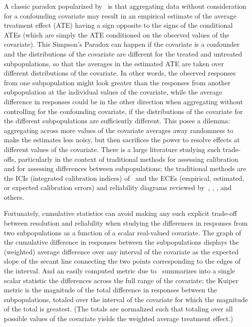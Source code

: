 \documentclass[]{fairmeta}
\begin{document}
A classic paradox popularized by~\cite{simpson} is that aggregating data
without consideration for a confounding covariate may result
in an empirical estimate of the average treatment effect (ATE)
having a sign opposite to the signs of the conditional ATEs
(which are simply the ATE conditioned on the observed values of the covariate).
This Simpson's Paradox can happen if the covariate is a confounder
and the distributions of the covariate are different
for the treated and untreated subpopulations, so that the averages
in the estimated ATE are taken over different distributions of the covariate.
In other words, the observed responses from one subpopulation
might look greater than the responses from another subpopulation
at the individual values of the covariate, while the average difference
in responses could be in the other direction when aggregating
without controlling for the confounding covariate, if the distributions
of the covariate for the different subpopulations are sufficiently different.
This poses a dilemma: aggregating across more values of the covariate
averages away randomness to make the estimates less noisy,
but then sacrifices the power to resolve effects at different values
of the covariate. There is a large literature studying such trade-offs,
particularly in the context of traditional methods for assessing calibration
and for assessing differences between subpopulations; the traditional methods
are the ICIs (integrated calibration indices) of~\cite{austin-steyerberg}
and the ECEs (empirical, estimated, or expected calibration errors)
and reliability diagrams reviewed by~\cite{brocker-smith}, \cite{brocker},
\cite{wilks}, and others.

Fortunately, cumulative statistics can avoid making any such explicit trade-off
between resolution and reliability when studying the differences in responses
from two subpopulations as a function of a scalar real-valued covariate.
The graph of the cumulative difference in responses between the subpopulations
displays the (weighted) average difference over any interval of the covariate
as the expected slope of the secant line connecting the two points
corresponding to the edges of the interval.
And an easily computed metric due to~\cite{kuiper} summarizes
into a single scalar statistic the differences across the full range
of the covariate; the Kuiper metric is the magnitude of the total difference
in responses between the subpopulations, totaled over the interval
of the covariate for which the magnitude of the total is greatest.
(The totals are normalized such that totaling over all possible values
of the covariate yields the weighted average treatment effect.)
\end{document}
